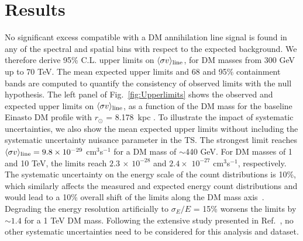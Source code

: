\documentclass[aps,prl,twocolumn,floats,balancelastpage,showpacs,showkeys,preprintnumbers,floatfix,nofootinbib,superscriptaddress, longbibliography]{revtex4-1}
\begin{document}
\section{Results}
\label{sec:results}
No significant excess compatible with a DM annihilation line signal is found in any of the
spectral and spatial bins with respect to the expected background.
We therefore derive 95\% C.L. upper limits on
$\langle \sigma v \rangle_{\rm line}$, for DM masses from 300 GeV up to 70 TeV. The mean expected upper limits and 68 and 95\% containment bands are computed to quantify
the consistency of observed limits with the null hypothesis.
The left panel of Fig.~\ref{fig:Upperlimits} shows the observed and expected upper limits on $\langle \sigma v \rangle_{\rm line}$, as a function of the DM mass for the baseline Einasto DM profile with $r_{\odot}$ = 8.178~kpc \cite{GRAVITY:2018ofz}. To illustrate the impact of systematic uncertainties, we also show the mean expected upper limits without including the systematic uncertainty nuisance parameter in the TS. The strongest limit reaches $\langle \sigma v \rangle_{\rm line} = 9.8 \times 10^{-29}$ cm$^3$s$^{-1}$ for a DM mass of $\sim$440 GeV. For DM masses of 1 and 10 TeV, the limits reach $2.3$ $\times$ $10^{-28}$ and $2.4 \times$ $10^{-27}$ cm$^3$s$^{-1}$, respectively.
The systematic uncertainty on the energy scale of the count distributions is 10\%, which similarly affects the measured and expected energy count distributions and would lead to a 10\% overall shift of the limits along the DM mass axis~\cite{HESS:2022ygk}. Degrading the energy resolution artificially to $\sigma_E/E$ = 15\% worsens the limits by $\sim 1.4$ for a 1 TeV DM mass. Following the extensive study presented in Ref.~\cite{HESS:2022ygk}, no other systematic uncertainties need to be considered for this analysis and dataset.
\end{document}
